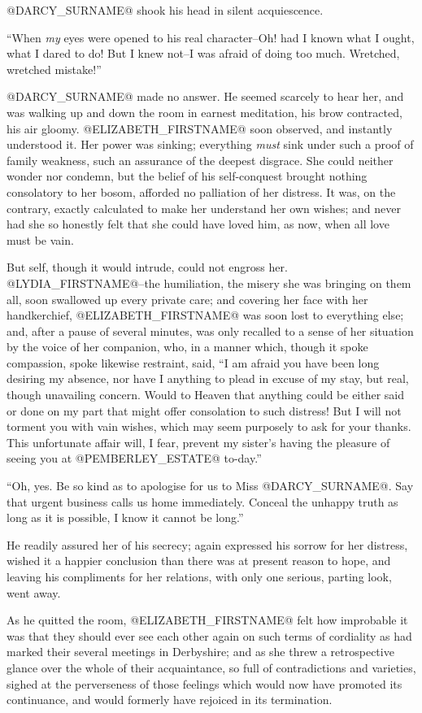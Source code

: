 @DARCY_SURNAME@ shook his head in silent acquiescence.

``When \textit{my} eyes were opened to his real character--Oh! had I known what
I ought, what I dared to do! But I knew not--I was afraid of doing too
much. Wretched, wretched mistake!''

@DARCY_SURNAME@ made no answer. He seemed scarcely to hear her, and was walking
up and down the room in earnest meditation, his brow contracted, his air
gloomy. @ELIZABETH_FIRSTNAME@ soon observed, and instantly understood it. Her
power was sinking; everything \textit{must} sink under such a proof of family
weakness, such an assurance of the deepest disgrace. She could neither
wonder nor condemn, but the belief of his self-conquest brought nothing
consolatory to her bosom, afforded no palliation of her distress. It
was, on the contrary, exactly calculated to make her understand her own
wishes; and never had she so honestly felt that she could have loved
him, as now, when all love must be vain.

But self, though it would intrude, could not engross her. @LYDIA_FIRSTNAME@--the
humiliation, the misery she was bringing on them all, soon swallowed
up every private care; and covering her face with her handkerchief,
@ELIZABETH_FIRSTNAME@ was soon lost to everything else; and, after a pause of
several minutes, was only recalled to a sense of her situation by
the voice of her companion, who, in a manner which, though it spoke
compassion, spoke likewise restraint, said, ``I am afraid you have been
long desiring my absence, nor have I anything to plead in excuse of my
stay, but real, though unavailing concern. Would to Heaven that anything
could be either said or done on my part that might offer consolation to
such distress! But I will not torment you with vain wishes, which may
seem purposely to ask for your thanks. This unfortunate affair will, I
fear, prevent my sister's having the pleasure of seeing you at @PEMBERLEY_ESTATE@
to-day.''

``Oh, yes. Be so kind as to apologise for us to Miss @DARCY_SURNAME@. Say that
urgent business calls us home immediately. Conceal the unhappy truth as
long as it is possible, I know it cannot be long.''

He readily assured her of his secrecy; again expressed his sorrow for
her distress, wished it a happier conclusion than there was at present
reason to hope, and leaving his compliments for her relations, with only
one serious, parting look, went away.

As he quitted the room, @ELIZABETH_FIRSTNAME@ felt how improbable it was that they
should ever see each other again on such terms of cordiality as
had marked their several meetings in Derbyshire; and as she threw a
retrospective glance over the whole of their acquaintance, so full
of contradictions and varieties, sighed at the perverseness of those
feelings which would now have promoted its continuance, and would
formerly have rejoiced in its termination.

